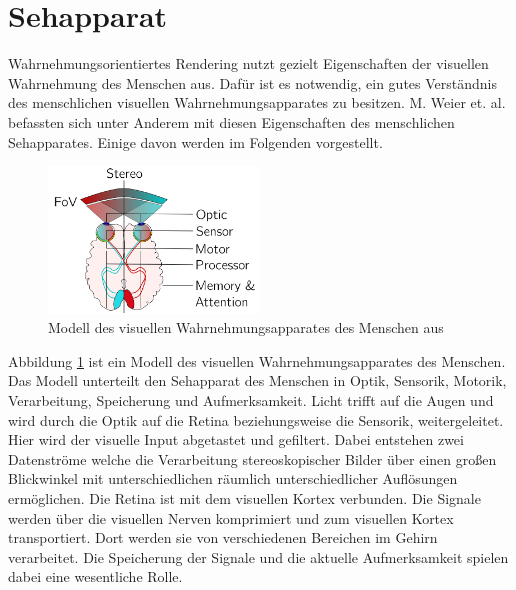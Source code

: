 \section{Sehapparat}\label{sec::eye}
Wahrnehmungsorientiertes Rendering nutzt gezielt Eigenschaften der visuellen Wahrnehmung des Menschen aus.
Dafür ist es notwendig, ein gutes Verständnis des menschlichen visuellen Wahrnehmungsapparates zu besitzen.
M. Weier et. al. \cite{doi:10.1111/cgf.13150} befassten sich unter Anderem mit diesen Eigenschaften des menschlichen Sehapparates.
Einige davon werden im Folgenden vorgestellt.
\begin{figure}
	\centering
	\includegraphics[width=0.5\textwidth]{../../Grafiken/HVS-model_from-star-report.png}
	\caption{Modell des visuellen Wahrnehmungsapparates des Menschen aus \cite{doi:10.1111/cfg.13150}}
	\label{fig::eye01}
\end{figure}
Abbildung \ref{fig::eye01} ist ein Modell des visuellen Wahrnehmungsapparates des Menschen.
Das Modell unterteilt den Sehapparat des Menschen in Optik, Sensorik, Motorik, Verarbeitung, Speicherung und Aufmerksamkeit.
Licht trifft auf die Augen und wird durch die Optik auf die Retina beziehungsweise die Sensorik, weitergeleitet.
Hier wird der visuelle Input abgetastet und gefiltert.
Dabei entstehen zwei Datenströme welche die Verarbeitung stereoskopischer Bilder über einen großen Blickwinkel mit unterschiedlichen räumlich unterschiedlicher Auflösungen ermöglichen.
Die Retina ist mit dem visuellen Kortex verbunden.
Die Signale werden über die visuellen Nerven komprimiert und zum visuellen Kortex transportiert.
Dort werden sie von verschiedenen Bereichen im Gehirn verarbeitet.
Die Speicherung der Signale und die aktuelle Aufmerksamkeit spielen dabei eine wesentliche Rolle.

